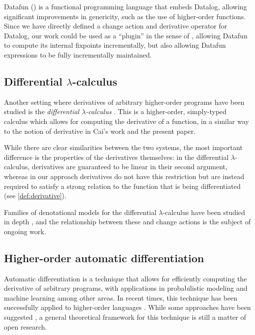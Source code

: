 Datafun (\textcite{arntz2016datafun}) is a functional programming language that embeds
Datalog, allowing significant improvements in genericity, such as the use of
higher-order functions. Since we have directly defined a change action and
derivative operator for Datalog, our work could be used as a ``plugin'' in the sense
of \citeauthor{cai2014changes}, allowing Datafun to compute its internal fixpoints
incrementally, but also allowing Datafun expressions to be fully incrementally maintained.

\subsection{Differential $\lambda$-calculus}

Another setting where derivatives of arbitrary higher-order programs have been studied
is the \emph{differential $\lambda$-calculus} \autocites{ehrhard2003differential}{ehrhard2017introduction}.
This is a higher-order, simply-typed
calculus which allows for computing the derivative of a function, in a similar
way to the notion of derivative in Cai's work and the present paper.

While there are clear similarities between the two systems, 
the most important difference is the properties of the derivatives themselves:
in the differential $\lambda$-calculus, derivatives are guaranteed to be linear
in their second argument, whereas in our approach derivatives do not have this restriction 
but are instead required to satisfy a strong relation to the function
that is being differentiated (see \cref{def:derivative}).

Families of denotational models for the differential $\lambda$-calculus have been
studied in depth
\autocites{bucciarelli2010categorical}{blute2010convenient}{cockett2016categorical}{kerjean2016mackey},
and the relationship between these and change actions is the subject of ongoing work.

\subsection{Higher-order automatic differentiation}

Automatic differentiation \autocite{griewank2008evaluating} is a technique that allows
for efficiently computing the derivative of arbitrary programs, with
applications in probabilistic modeling \autocite{kucukelbir2017automatic}
and machine learning \autocite{baydin2014automatic} among other areas. In recent times, this technique has been successfully
applied to higher-order languages \autocites{siskind2008nesting}{baydin2016diffsharp}.
While some approaches have been suggested \autocites{manzyuk2012simply}{kelly2016evolving}, a general
theoretical framework for this technique is still a matter of open research. 

